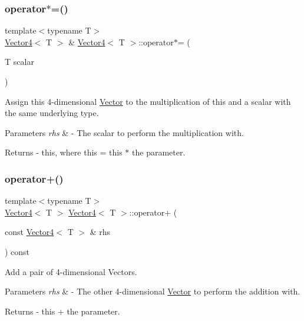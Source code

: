 \subsubsection{\texorpdfstring{operator$\ast$=()}{operator*=()}}
{\footnotesize\ttfamily template$<$typename T$>$ \\
\mbox{\hyperlink{class_vector4}{Vector4}}$<$ T $>$ \& \mbox{\hyperlink{class_vector4}{Vector4}}$<$ T $>$\+::operator$\ast$= (\begin{DoxyParamCaption}\item[{T}]{scalar }\end{DoxyParamCaption})}

Assign this 4-\/dimensional \mbox{\hyperlink{class_vector}{Vector}} to the multiplication of this and a scalar with the same underlying type. 
\begin{DoxyParams}{Parameters}
{\em rhs} & -\/ The scalar to perform the multiplication with. \\
\hline
\end{DoxyParams}
\begin{DoxyReturn}{Returns}
-\/ this, where \textquotesingle{}this = this $\ast$ the parameter\textquotesingle{}. 
\end{DoxyReturn}
\mbox{\label{class_vector4_a2a7fd8018536c8e7c61b8ee3975609f9}} 
\subsubsection{\texorpdfstring{operator+()}{operator+()}}
{\footnotesize\ttfamily template$<$typename T$>$ \\
\mbox{\hyperlink{class_vector4}{Vector4}}$<$ T $>$ \mbox{\hyperlink{class_vector4}{Vector4}}$<$ T $>$\+::operator+ (\begin{DoxyParamCaption}\item[{const \mbox{\hyperlink{class_vector4}{Vector4}}$<$ T $>$ \&}]{rhs }\end{DoxyParamCaption}) const}

Add a pair of 4-\/dimensional Vectors. 
\begin{DoxyParams}{Parameters}
{\em rhs} & -\/ The other 4-\/dimensional \mbox{\hyperlink{class_vector}{Vector}} to perform the addition with. \\
\hline
\end{DoxyParams}
\begin{DoxyReturn}{Returns}
-\/ this + the parameter. 
\end{DoxyReturn}
\mbox{\label{class_vector4_a0c84d5598e0a4e4421184ddc751d710b}} 
